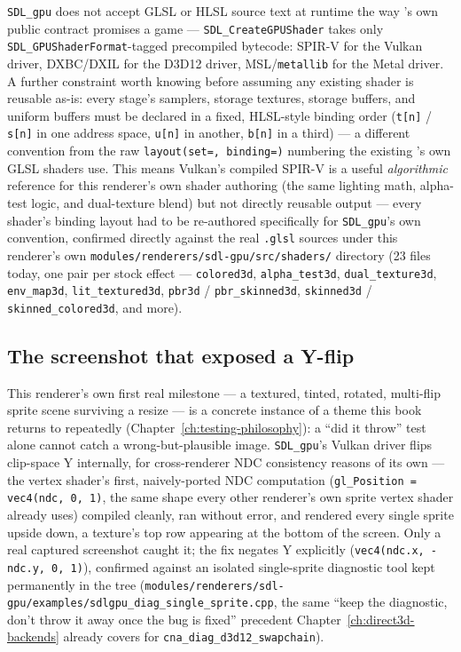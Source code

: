 \texttt{SDL\_gpu} does not accept GLSL or HLSL source text at runtime the way
's own public contract promises a game --- \texttt{SDL\_CreateGPUShader}
takes only \texttt{SDL\_GPUShaderFormat}-tagged precompiled bytecode: SPIR-V for the Vulkan
driver, DXBC/DXIL for the D3D12 driver, MSL/\texttt{metallib} for the Metal driver. A further
constraint worth knowing before assuming any existing shader is reusable as-is: every stage's
samplers, storage textures, storage buffers, and uniform buffers must be declared in a fixed,
HLSL-style binding order (\texttt{t[n]} / \texttt{s[n]} in one address space, \texttt{u[n]} in
another, \texttt{b[n]} in a third) --- a different convention from the raw
\texttt{layout(set=, binding=)} numbering the existing 's own
GLSL shaders use. This means Vulkan's compiled SPIR-V is a useful \emph{algorithmic} reference
for this renderer's own shader authoring (the same lighting math, alpha-test logic, and
dual-texture blend) but not directly reusable output --- every shader's binding layout had to
be re-authored specifically for \texttt{SDL\_gpu}'s own convention, confirmed directly against
the real \texttt{.glsl} sources under this renderer's own
\texttt{modules/renderers/sdl-gpu/src/shaders/}
directory (23 files today, one pair per stock effect --- \texttt{colored3d},
\texttt{alpha\_test3d}, \texttt{dual\_texture3d}, \texttt{env\_map3d}, \texttt{lit\_textured3d},
\texttt{pbr3d} / \texttt{pbr\_skinned3d}, \texttt{skinned3d} / \texttt{skinned\_colored3d}, and more).

\subsection{The screenshot that exposed a Y-flip}

This renderer's own first real milestone --- a textured, tinted, rotated, multi-flip sprite
scene surviving a resize --- is a concrete instance of a theme this book returns to
repeatedly (Chapter~\ref{ch:testing-philosophy}): a ``did it throw'' test alone cannot catch a
wrong-but-plausible image. \texttt{SDL\_gpu}'s Vulkan driver flips clip-space Y internally, for
cross-renderer NDC consistency reasons of its own --- the vertex shader's first, naively-ported
NDC computation (\texttt{gl\_Position = vec4(ndc, 0, 1)}, the same shape every other renderer's
own sprite vertex shader already uses) compiled cleanly, ran without error, and rendered every
single sprite upside down, a texture's top row appearing at the bottom of the screen. Only a
real captured screenshot caught it; the fix negates Y explicitly
(\texttt{vec4(ndc.x, -ndc.y, 0, 1)}), confirmed against an isolated single-sprite diagnostic
tool kept permanently in the tree (\texttt{modules/renderers/sdl-gpu/examples/\allowbreak{}sdlgpu\_diag\_single\_sprite.cpp}, the same
``keep the diagnostic, don't throw it away once the bug is fixed'' precedent
Chapter~\ref{ch:direct3d-backends} already covers for \texttt{cna\_diag\_d3d12\_swapchain}).


